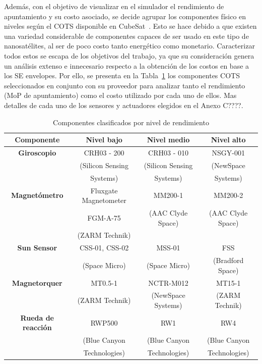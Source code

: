 Además, con el objetivo de visualizar en el simulador el rendimiento de apuntamiento y su costo asociado, se decide agrupar los componentes físico en niveles según el COTS disponible en CubeSat~\cite{ref45}. Esto se hace debido a que existen una variedad considerable de componentes capaces de ser usado en este tipo de nanosatélites, al ser de poco costo tanto energético como monetario. Caracterizar todos estos se escapa de los objetivos del trabajo, ya que su consideración genera un análisis extenso e innecesario respecto a la obtención de los costos en base a los SE envelopes. Por ello, se presenta en la Tabla~\ref{tab:niveles} los componentes COTS seleccionados en conjunto con su proveedor para analizar tanto el rendimiento (MoP de apuntamiento) como el costo utilizado por cada uno de ellos. Mas detalles de cada uno de los sensores y actuadores elegidos en el Anexo C????.

\begin{table}[h!]
	\centering
	\caption{Componentes clasificados por nivel de rendimiento}
	\begin{tabular}{|c|c|c|c|}
		\hline
		\textbf{Componente}   & \textbf{Nivel bajo} & \textbf{Nivel medio} & \textbf{Nivel alto} \\ 
		\hline
		\textbf{Giroscopio}   & CRH03 - 200  & CRH03 - 010  & NSGY-001   \\
		& (Silicon Sensing  & (Silicon Sensing & (NewSpace \\
		& Systems) & Systems) & Systems) \\
		\hline
		\textbf{Magnetómetro} & Fluxgate Magnetometer & MM200-1 & MM200-2  \\
		& FGM-A-75 & (AAC Clyde Space) & (AAC Clyde Space) \\
		& (ZARM Technik) & & \\
		\hline
		\textbf{Sun Sensor}   & CSS-01, CSS-02  & MSS-01 & FSS  \\
		& (Space Micro)   & (Space Micro) & (Bradford Space) \\
		\hline
		\textbf{Magnetorquer} & MT0.5-1 & NCTR-M012 & MT15-1 \\
		& (ZARM Technik) & (NewSpace Systems) & (ZARM Technik) \\
		\hline
		\textbf{Rueda de reacción} & RWP500 & RW1  & RW4  \\
		& (Blue Canyon & (Blue Canyon & (Blue Canyon \\
		& Technologies) & Technologies) & Technologies) \\
		\hline
	\end{tabular}
	\label{tab:niveles}
\end{table}



